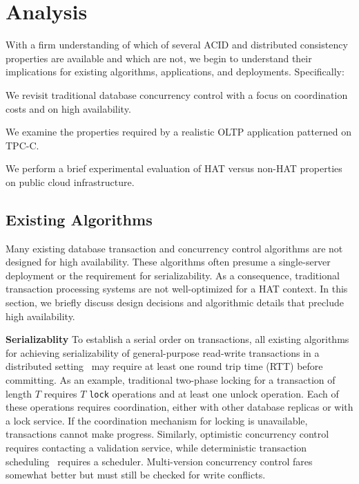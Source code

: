 
\section{Analysis}
\label{sec:evaluation}

With a firm understanding of which of several ACID and distributed
consistency properties are available and which are not, we begin to
understand their implications for existing algorithms, applications,
and deployments. Specifically:

\begin{myenumerate}
\item We revisit traditional database concurrency control with a focus
  on coordination costs and on high availability.
\item We examine the properties required by a realistic OLTP
  application patterned on TPC-C.
\item We perform a brief experimental evaluation of HAT versus non-HAT
  properties on public cloud infrastructure.
\end{myenumerate}

\subsection{Existing Algorithms}

Many existing database transaction and concurrency control algorithms
are not designed for high availability. These algorithms often presume
a single-server deployment or the requirement for serializability. As
a consequence, traditional transaction processing systems are not
well-optimized for a HAT context. In this section, we briefly discuss
design decisions and algorithmic details that preclude high
availability.

\vspace{.5em}\noindent\textbf{Serializablity} To establish a serial
order on transactions, all existing algorithms for achieving
serializability of general-purpose read-write transactions in a
distributed setting~\cite{bernstein-book} may require at least one
round trip time (RTT) before committing. As an example, traditional
two-phase locking for a transaction of length $T$ requires $T$
\texttt{lock} operations and at least one unlock operation.  Each of
these operations requires coordination, either with other database
replicas or with a lock service. If the coordination mechanism for
locking is unavailable, transactions cannot make progress. Similarly,
optimistic concurrency control requires contacting a validation
service, while deterministic transaction
scheduling~\cite{deterministic-scheduling} requires a
scheduler. Multi-version concurrency control fares somewhat better but
must still be checked for write conflicts.

